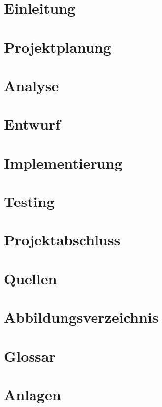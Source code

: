 \documentclass[11pt]{article}
\begin{document}

    
    \newpage
    \tableofcontents
    \newpage
    \section{Einleitung}
    
    \pagebreak
    \section{Projektplanung}
    
    \pagebreak
    \section{Analyse}
    
    \pagebreak
    \section{Entwurf}
    
    \pagebreak
    \section{Implementierung}
    
    \pagebreak
    \section{Testing}
    
    \pagebreak
    \section{Projektabschluss}
    

    \clearpage
    \pagestyle{plain} %
    \section{Quellen}
    
    \pagebreak
    \section{Abbildungsverzeichnis}
    
    \pagebreak
    \section{Glossar}
    
    \pagebreak
    \section{Anlagen}
\end{document}

